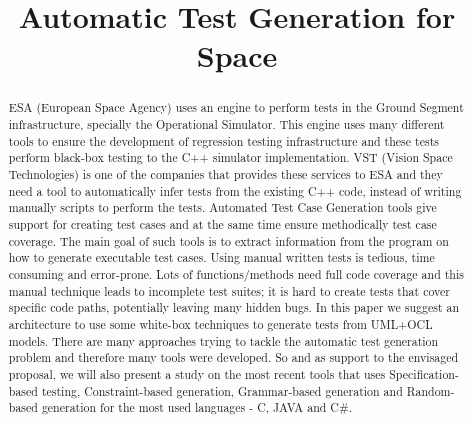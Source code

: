 \documentclass[10pt, conference, compsocconf]{IEEEtran}
\begin{document}
\title{Automatic Test Generation for Space}

\author{
\and
{}
\and
{}
}

\maketitle

\begin{abstract}
ESA (European Space Agency) uses an engine to perform tests in the Ground Segment infrastructure, specially the Operational Simulator.
This engine uses many different tools to ensure the development of regression testing infrastructure and
these tests perform black-box testing to the C++ simulator implementation.
VST (Vision Space Technologies) is one of the companies that provides these services to ESA and they need a tool to
automatically infer tests from the existing C++ code, instead of writing manually scripts to perform the tests.
Automated Test Case Generation tools give support for creating test cases and at the same time ensure methodically test case coverage.
The main goal of such tools is to extract information from the program on how to generate executable test cases.
Using manual written tests is tedious, time consuming and error-prone.
Lots of functions/methods need full code coverage and this manual technique leads to incomplete test suites;
it is hard to create tests that cover specific code paths, potentially leaving many hidden bugs.
In this paper we suggest an architecture to use some white-box techniques to generate tests from UML+OCL models.
There are many approaches trying to tackle the automatic test generation problem and therefore many tools were developed.
So and as support to the envisaged proposal, we will also present a study on the most recent tools that uses
Specification-based testing, Constraint-based generation, Grammar-based generation and Random-based generation for the most used languages - C, JAVA and C\#.
\end{abstract}
\end{document}
